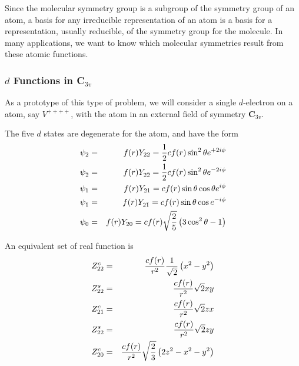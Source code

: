 Since the molecular symmetry group is a subgroup of the symmetry group 
of an atom, a basis for any irreducible representation of an atom is a 
basis for a representation, usually reducible, of the symmetry group 
for the molecule.  In many applications, we want to know which 
molecular symmetries result from these atomic functions.

\subsubsection{ $d$ Functions in C$_{3v}$}

As a prototype of this type of problem, we will consider a single 
$d$-electron on a atom, say $V^{++++}$, with the atom in an external 
field of symmetry {\bf C}$_{3v}$.

The five $d$ states are degenerate for the atom, and have the form
\begin{eqnarray}
\psi_2 &=& f(r)Y_{22} = {1 \over 2} cf(r) \sin^2 \theta e^{+2i\phi}\cr
\psi_{\bar{2}} &=& f(r)Y_{2{\bar{2}}} = {1 \over 2} cf(r) 
\sin^2 \theta e^{-2i\phi}\cr
\psi_1 &=& f(r)Y_{21} = cf(r) \sin \theta \cos \theta e^{i\phi}\cr
\psi_{\bar{1}} &=& f(r)Y_{2{\bar{1}}} = cf (r) \sin \theta \cos e^{-i\phi}\cr
\psi_0 &=& f(r)Y_{20} = cf(r) \sqrt{{2 \over 5}} \left( 3 \cos^2 
\theta - 1 \right)
\label{chap16-eqno35}
\end{eqnarray}

An equivalent set of real function is
\begin{eqnarray}
Z^c_{22} &=& {cf(r) \over r^2} {1 \over \sqrt{2}} \left( x^2 - y^2 
\right)\cr
Z^s_{22} &=& {cf(r) \over r^2} \sqrt{2} xy\cr
Z^c_{21} &=& {cf(r) \over r^2} {\sqrt{2}} zx\cr
Z^s_{22} &=& {cf(r) \over r^2} {\sqrt{2}} zy\cr
Z^c_{20} &=& {cf(r) \over r^2} {\sqrt{2 \over 3}} \left( 2z^2 - x^2 - 
y^2 \right)
\label{chap16-eqno36}
\end{eqnarray}

